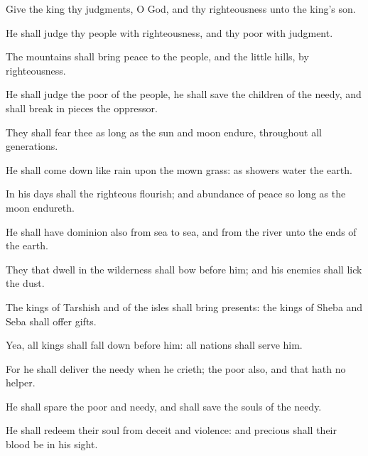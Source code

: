 {\Q {}Give the
king thy
judgments, O
God, and thy
righteousness unto the
king’s
son.


\par }{\BB \par }
{\Q {}He shall
judge thy
people with
righteousness, and thy
poor with
judgment.


\par }{\Q {}The
mountains shall
bring
peace to the
people, and the little
hills, by
righteousness.


\par }{\Q {}He shall
judge the
poor of the
people, he shall
save the
children of the
needy, and shall break in
pieces the
oppressor.


\par }{\Q {}They shall
fear thee as long
as the
sun and
moon
endure, throughout
all
generations.


\par }{\Q {}He shall come
down like
rain upon the
mown grass: as
showers
{}
water the
earth.


\par }{\Q {}In his
days shall the
righteous
flourish; and
abundance of
peace so long as the
moon endureth.


\par }{\Q {}He shall have
dominion also from
sea to
sea, and from the
river unto the
ends of the
earth.


\par }{\Q {}They that dwell in the
wilderness shall
bow
before him; and his
enemies shall
lick the
dust.


\par }{\Q {}The
kings of
Tarshish and of the
isles shall
bring
presents: the
kings of
Sheba and
Seba shall
offer
gifts.


\par }{\Q {}Yea, all
kings shall fall
down before him: all
nations shall
serve him.


\par }{\Q {}For he shall
deliver the
needy when he
crieth; the
poor also, and
{} that hath no
helper.


\par }{\Q {}He shall
spare the
poor and
needy, and shall
save the
souls of the
needy.


\par }{\Q {}He shall
redeem their
soul from
deceit and
violence: and
precious shall their
blood be in his
sight.


}
